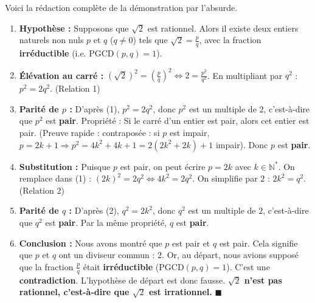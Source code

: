 \documentclass[11pt]{article}
\begin{document}
\begin{corrige}
Voici la rédaction complète de la démonstration par l'absurde.

\begin{enumerate}
    \item \textbf{Hypothèse :} Supposons que $\sqrt{2}$ est rationnel.
    Alors il existe deux entiers naturels non nuls $p$ et $q$ ($q \neq 0$) tels que $\sqrt{2} = \frac{p}{q}$, avec la fraction \textbf{irréductible} (i.e. $\text{PGCD}(p,q)=1$).
    
    \item \textbf{Élévation au carré :} $(\sqrt{2})^2 = \left(\frac{p}{q}\right)^2 \iff 2 = \frac{p^2}{q^2}$.
    En multipliant par $q^2$ : $\boxed{p^2 = 2q^2}$. \hfill (Relation 1)
    
    \item \textbf{Parité de $p$ :} D'après (1), $p^2 = 2q^2$, donc $p^2$ est un multiple de $2$, c'est-à-dire que $p^2$ est \textbf{pair}.
    Propriété : Si le carré d'un entier est pair, alors cet entier est pair.
    (Preuve rapide : contraposée : si $p$ est impair, $p=2k+1 \Rightarrow p^2=4k^2+4k+1=2(2k^2+2k)+1$ impair).
    Donc $p$ est \textbf{pair}.
    
    \item \textbf{Substitution :} Puisque $p$ est pair, on peut écrire $p = 2k$ avec $k \in \mathbb{N}^*$.
    On remplace dans (1) : $(2k)^2 = 2q^2 \iff 4k^2 = 2q^2$.
    On simplifie par $2$ : $\boxed{2k^2 = q^2}$. \hfill (Relation 2)
    
    \item \textbf{Parité de $q$ :} D'après (2), $q^2 = 2k^2$, donc $q^2$ est un multiple de $2$, c'est-à-dire que $q^2$ est \textbf{pair}.
    Par la même propriété, $q$ est \textbf{pair}.
    
    \item \textbf{Conclusion :} Nous avons montré que $p$ est pair et $q$ est pair.
    Cela signifie que $p$ et $q$ ont un diviseur commun : $2$.
    Or, au départ, nous avions supposé que la fraction $\frac{p}{q}$ était \textbf{irréductible} (PGCD$(p,q)=1$).
    C'est une \textbf{contradiction}.
    L'hypothèse de départ est donc fausse.
    \textbf{$\sqrt{2}$ n'est pas rationnel, c'est-à-dire que $\sqrt{2}$ est irrationnel.} $\blacksquare$
\end{enumerate}
\end{corrige}
\end{document}
